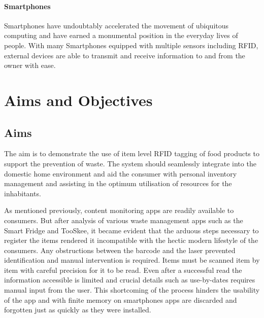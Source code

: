 \documentclass[a4paper, 11pt]{article}
\begin{document}
\paragraph{Smartphones}Smartphones have undoubtably accelerated the movement of ubiquitous computing and have earned a monumental position in the everyday lives of people. With many Smartphones equipped with multiple sensors including RFID, external devices are able to transmit and receive information to and from the owner with ease. 


\clearpage

\section{Aims and Objectives}
\subsection{Aims}

The aim is to demonstrate the use of item level RFID tagging of food products to support the prevention of waste. The system should seamlessly integrate into the domestic home environment and aid the consumer with personal inventory management and assisting in the optimum utilisation of resources for the inhabitants. 

As mentioned previously, content monitoring apps are readily available to consumers. But after analysis of various waste management apps such as the Smart Fridge and TooSkee, it became evident that the arduous steps necessary to register the items rendered it incompatible with the hectic modern lifestyle of the consumers. Any obstructions between the barcode and the laser prevented identification and manual intervention is required. Items must be scanned item by item with careful precision for it to be read. Even after a successful read the information accessible is limited and crucial details such as use-by-dates requires manual input from the user. This shortcoming of the process hinders the usability of the app and with finite memory on smartphones apps are discarded and forgotten just as quickly as they were installed.
\end{document}
